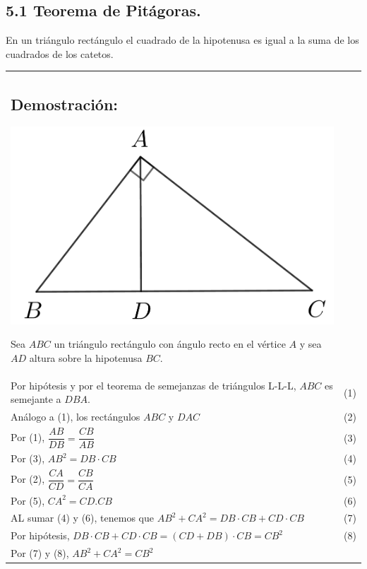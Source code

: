 \documentclass[12pt,a4paper]{article}
\begin{document}
\subsection*{5.1 Teorema de Pitágoras.}
En un triángulo rectángulo el cuadrado de la hipotenusa es igual a la suma de los cuadrados de los catetos.
\\
\begin{tabular}{p{15.9 cm} p{1cm}}
\subsection*{Demostración:}
\begin{center}
\includegraphics[scale=0.8]{Imagenes/pitagoras.png} 
\end{center}
Sea $ABC$ un triángulo rectángulo con ángulo recto en el vértice $A$ y sea $AD$ altura sobre la hipotenusa $BC$.
\\Por hipótesis y por el teorema de semejanzas de triángulos L-L-L, $ABC$ es semejante a $DBA$. &(1)
\\Análogo a (1), los rectángulos $ABC$ y $DAC$ & (2)
\\Por (1), $\dfrac{AB}{DB}=\dfrac{CB}{AB}$ & (3)
\\Por (3), $AB^2=DB \cdot CB$ &(4)
\\Por (2),  $\dfrac{CA}{CD}=\dfrac{CB}{CA}$ &(5)
\\Por (5), $CA^2=CD.CB$ &(6)
\\AL sumar (4) y (6), tenemos que $AB^2+CA^2=DB\cdot CB + CD\cdot CB$ & (7)
\\Por hipótesis, $DB\cdot CB + CD\cdot CB=(CD +DB)\cdot CB=CB^2$ &(8)
\\Por (7) y (8), $AB^2 + CA^2=CB^2$
\end{tabular}
\end{document}
